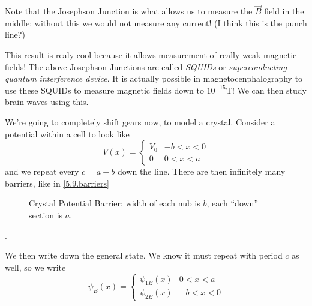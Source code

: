 \documentclass[10pt]{report}
\begin{document}
Note that the Josephson Junction is what allows us to measure the $\vec{B}$ field in the middle; without this we would not measure any current! (I think this is the punch line?)

This result is realy cool because it allows measurement of really weak magnetic fields! The above Josephson Junctions are called \emph{SQUIDs} or \emph{superconducting quantum interference device}. It is actually possible in magnetocenphalography to use these SQUIDs to measure magnetic fields down to $10^{-15}\mathrm{T}$! We can then study brain waves using this.

We're going to completely shift gears now, to model a crystal. Consider a potential within a cell to look like
\begin{equation}
    V(x) =
    \begin{cases}
        V_0 & -b < x < 0\\
        0 & 0 < x < a
    \end{cases}
\end{equation}
and we repeat every $c = a+b$ down the line. There are then infinitely many barriers, like in \eqref{5.9.barriers}
\begin{figure}[!h]
    \centering
    \caption{Crystal Potential Barrier; width of each nub is $b$, each ``down'' section is $a$.}
    \label{5.9.barriers}
\end{figure}.

We then write down the general state. We know it must repeat with period $c$ as well, so we write
\begin{equation}
    \psi_E(x) =
    \begin{cases}
        \psi_{1E}(x) & 0 < x < a\\
        \psi_{2E}(x) & -b < x < 0
    \end{cases}
\end{equation}
\end{document}
